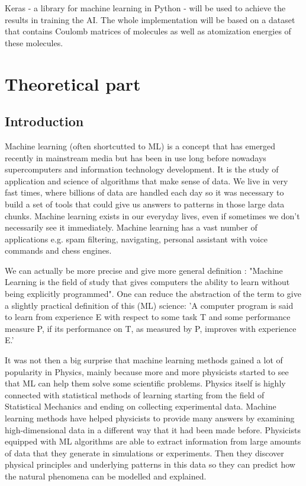 \documentclass[a4paper,oneside,openright,11pt]{book}
\begin{document}
Keras - a library for machine learning in Python -  will be used to achieve the results in training the AI. The whole implementation will be based on a dataset that contains Coulomb matrices of molecules as well as atomization energies of these molecules. 


\part{Theoretical part}

\chapter{Introduction}

Machine learning (often shortcutted to ML) is a concept that has emerged recently in mainstream media but has been in use long before nowadays supercomputers and information technology development. It is the study of application and science of algorithms that make sense of data. We live in very fast times, where billions of data are handled each day so it was necessary to build a set of tools that could give us answers to patterns in those large data chunks. Machine learning exists in our everyday lives, even if sometimes we don't necessarily see it immediately. Machine learning has a vast number of applications e.g. spam filtering, navigating, personal assistant with voice commands and chess engines.

We can actually be more precise and give more general definition \cite{aurelion}: "Machine Learning is the field of study that gives computers the ability to learn without being explicitly programmed". One can reduce the abstraction of the term to give a slightly practical definition of this (ML) science: 'A computer program is said to learn from experience E with respect to some task T and some performance measure P, if its performance on T, as measured by P, improves with experience E.'\cite{aurelion}

It was not then a big surprise that machine learning methods gained a lot of popularity in Physics, mainly because more and more physicists started to see that ML can help them solve some scientific problems. Physics itself is highly connected with statistical methods of learning starting from the field of Statistical Mechanics and ending on collecting experimental data. Machine learning methods have helped physicists to provide many answers by examining high-dimensional data in a different way that it had been made before. Physicists equipped with ML algorithms are able to extract information from large amounts of data  that they generate in simulations or experiments. Then they discover physical principles and underlying patterns in this data so they can predict how the natural phenomena can be modelled and explained. \cite{ucla}
\end{document}

